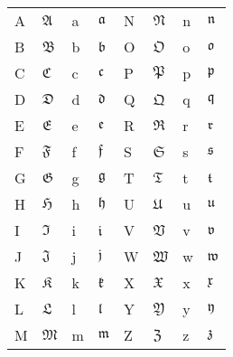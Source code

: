 \documentclass[../../../include/open-logic-chapter]{subfiles}
\begin{document}

\begin{center}
    \begin{tabular}{llll@{\qquad}llll}
    A &	$\mathfrak{A}$ & a & $\mathfrak{a}$ &
    N &	$\mathfrak{N}$ & n & $\mathfrak{n}$ \\
    B &	$\mathfrak{B}$ & b & $\mathfrak{b}$ &
    O &	$\mathfrak{O}$ & o & $\mathfrak{o}$ \\
    C &	$\mathfrak{C}$ & c & $\mathfrak{c}$ &
    P &	$\mathfrak{P}$ & p & $\mathfrak{p}$ \\
    D &	$\mathfrak{D}$ & d & $\mathfrak{d}$ &
    Q &	$\mathfrak{Q}$ & q & $\mathfrak{q}$ \\
    E &	$\mathfrak{E}$ & e & $\mathfrak{e}$ &
    R &	$\mathfrak{R}$ & r & $\mathfrak{r}$ \\
    F &	$\mathfrak{F}$ & f & $\mathfrak{f}$ &
    S &	$\mathfrak{S}$ & s & $\mathfrak{s}$ \\
    G &	$\mathfrak{G}$ & g & $\mathfrak{g}$ &
    T &	$\mathfrak{T}$ & t & $\mathfrak{t}$ \\
    H &	$\mathfrak{H}$ & h & $\mathfrak{h}$ &
    U &	$\mathfrak{U}$ & u & $\mathfrak{u}$ \\
    I &	$\mathfrak{I}$ & i & $\mathfrak{i}$ &
    V &	$\mathfrak{V}$ & v & $\mathfrak{v}$ \\
    J &	$\mathfrak{J}$ & j & $\mathfrak{j}$ &
    W &	$\mathfrak{W}$ & w & $\mathfrak{w}$ \\
    K &	$\mathfrak{K}$ & k & $\mathfrak{k}$ &
    X &	$\mathfrak{X}$ & x & $\mathfrak{x}$ \\
    L &	$\mathfrak{L}$ & l & $\mathfrak{l}$ &
    Y &	$\mathfrak{Y}$ & y & $\mathfrak{y}$ \\
    M &	$\mathfrak{M}$ & m & $\mathfrak{m}$ &
    Z &	$\mathfrak{Z}$ & z & $\mathfrak{z}$ 
    \end{tabular}
    \end{center}
\end{document}
